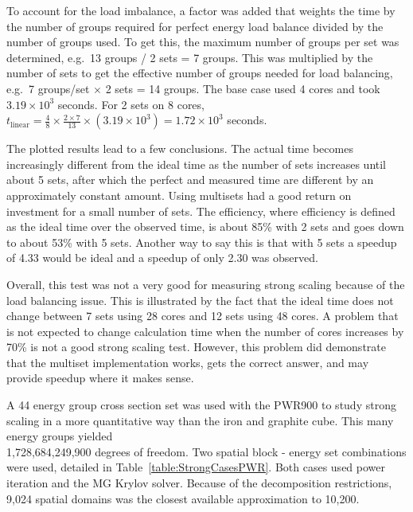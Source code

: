 To account for the load imbalance, a factor was added that weights the time by the number of groups required for perfect energy load balance divided by the number of groups used. To get this, the maximum number of groups per set was determined, e.g.\ 13 groups / 2 sets = 7 groups. This was multiplied by the number of sets to get the effective number of groups needed for load balancing, e.g.\ 7 groups/set $\times$ 2 sets = 14 groups. The base case used 4 cores and took $3.19 \times 10^{3}$ seconds. For 2 sets on 8 cores, $t_{\text{linear}} = \frac{4}{8}\times\frac{2\times7}{13} \times (3.19 \times 10^{3}) = 1.72 \times 10^{3}$ seconds.

The plotted results lead to a few conclusions. The actual time becomes increasingly different from the ideal time as the number of sets increases until about 5 sets, after which the perfect and measured time are different by an approximately constant amount. Using multisets had a good return on investment for a small number of sets. The efficiency, where efficiency is defined as the ideal time over the observed time, is about 85\% with 2 sets and goes down to about 53\% with 5 sets. Another way to say this is that with 5 sets a speedup of 4.33 would be ideal and a speedup of only 2.30 was observed. 

Overall, this test was not a very good for measuring strong scaling because of the load balancing issue. This is illustrated by the fact that the ideal time does not change between 7 sets using 28 cores and 12 sets using 48 cores. A problem that is not expected to change calculation time when the number of cores increases by 70\% is not a good strong scaling test. However, this problem did demonstrate that the multiset implementation works, gets the correct answer, and may provide speedup where it makes sense.  

A 44 energy group cross section set was used with the PWR900 to study strong scaling in a more quantitative way than the iron and graphite cube. This many energy groups yielded \\ 1,728,684,249,900 degrees of freedom. Two spatial block - energy set combinations were used, detailed in Table~\ref{table:StrongCasesPWR}. Both cases used power iteration and the MG Krylov solver. Because of the decomposition restrictions, 9,024 spatial domains was the closest available approximation to 10,200.

